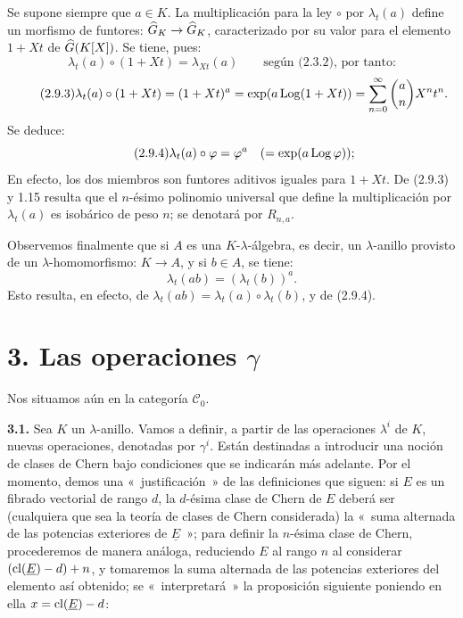 \providecommand{\sisi}[2]{#2}

Se supone siempre que \(a\in K\). La multiplicación para la ley \(\circ\) por \(\lambda_t(a)\) define un morfismo de funtores: \(\widehat G_K\to\widehat G_K\), caracterizado por su valor para el elemento \(1+Xt\) de \(\widehat G(K[X])\). Se tiene, pues:
\[
  \lambda_t(a)\circ(1+Xt)=\lambda_{Xt}(a)\qquad\text{según (2.3.2), por tanto:}
\]
\begin{equation}\tag{2.9.3}
  \lambda_t(a)\circ(1+Xt)
  =(1+Xt)^a
  =\exp(a\operatorname{Log}(1+Xt))
  =\sum_{n=0}^{\infty}\binom{a}{n}X^nt^n .
\end{equation}
Se deduce:
\begin{equation}\tag{2.9.4}
  \lambda_t(a)\circ\varphi=\varphi^a
  \quad(=\exp(a\operatorname{Log}\varphi)) ;
\end{equation}
En efecto, los dos miembros son funtores aditivos iguales para \(1+Xt\). De (2.9.3) y 1.15 resulta que el \(n\)-ésimo polinomio universal que define la multiplicación por \(\lambda_t(a)\) es isobárico de peso \(n\); se denotará por \(R_{n,a}\).

Observemos finalmente que si \(A\) es una \(K\)-\(\lambda\)-álgebra, es decir, un \(\lambda\)-anillo provisto de un \(\lambda\)-homomorfismo: \(K\to A\), y si \(b\in A\), se tiene:
\begin{equation}\tag{2.9.5}
  \lambda_t(ab)=(\lambda_t(b))^a .
\end{equation}
Esto resulta, en efecto, de \(\lambda_t(ab)=\lambda_t(a)\circ\lambda_t(b)\), y de (2.9.4).

\section*{3. Las operaciones \(\gamma\)}

Nos situamos aún en la categoría \(\mathcal C_0\).

\textbf{3.1.} Sea \(K\) un \(\lambda\)-anillo. Vamos a definir, a partir de las operaciones \(\lambda^i\) de \(K\), nuevas operaciones, denotadas por \(\gamma^i\). Están destinadas a introducir una noción de clases de Chern bajo condiciones que se indicarán más adelante. Por el momento, demos una «~justificación~» de las definiciones que siguen: si \(E\) es un fibrado vectorial de rango \(d\), la \(d\)-ésima clase de Chern de \(E\) deberá ser (cualquiera que sea la teoría de clases de Chern considerada) la «~suma alternada de las potencias exteriores de \(\underline E\)~»; para definir la \(n\)-ésima clase de Chern, procederemos de manera análoga, reduciendo \(E\) al rango \(n\) al considerar \((\operatorname{cl}(\underline E)-d)+n\), y tomaremos la suma alternada de las potencias exteriores del elemento así obtenido; se «~interpretará~» la proposición siguiente poniendo en ella \(x=\operatorname{cl}(\underline E)-d\):

